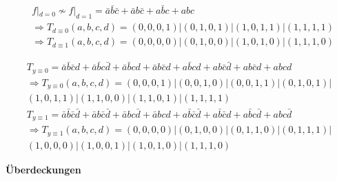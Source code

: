 \documentclass[fleqn]{article}
\begin{document}
\begin{equation}
    \begin{aligned}
&f|_{d=0} \nsim f|_{d=1} =  \bar{a}\bar{b}\bar{c}+\bar{a}b\bar{c}+a\bar{b}c+abc\\
&\Rightarrow T_{d\equiv 0}(a,b,c,d) = (0,0,0,1)|(0,1,0,1)|(1,0,1,1)|(1,1,1,1)\\
&\Rightarrow T_{d\equiv 1}(a,b,c,d) = (0,0,0,0)|(0,1,0,0)|(1,0,1,0)|(1,1,1,0)
    \end{aligned}
\end{equation}

\begin{equation}
    \begin{aligned}
T_{y\equiv0} = \bar{a}\bar{b}\bar{c}d+\bar{a}\bar{b}c\bar{d}+\bar{a}\bar{b}cd+\bar{a}b\bar{c}d+a\bar{b}cd+ab\bar{c}\bar{d}+ab\bar{c}d+abcd\\
\Rightarrow T_{y\equiv 0}(a,b,c,d) = (0,0,0,1)|(0,0,1,0)|(0,0,1,1)|(0,1,0,1)|\\(1,0,1,1)|(1,1,0,0)|(1,1,0,1)|(1,1,1,1)\\
T_{y\equiv1} = \bar{a}\bar{b}\bar{c}\bar{d}+\bar{a}b\bar{c}\bar{d}+\bar{a}bc\bar{d}+\bar{a}bcd+a\bar{b}\bar{c}\bar{d}+a\bar{b}\bar{c}d+a\bar{b}c\bar{d}+abc\bar{d}\\
\Rightarrow T_{y\equiv 1}(a,b,c,d) = (0,0,0,0)|(0,1,0,0)|(0,1,1,0)|(0,1,1,1)|\\(1,0,0,0)|(1,0,0,1)|(1,0,1,0)|(1,1,1,0)
    \end{aligned}
\end{equation}

\textbf{Überdeckungen}
\end{document}
